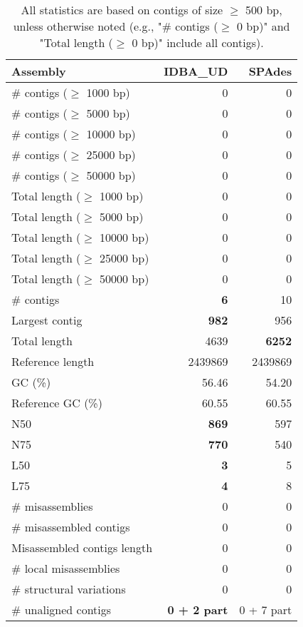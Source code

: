\documentclass[12pt,a4paper]{article}
\begin{document}
\begin{table}[ht]
\begin{center}
\caption{All statistics are based on contigs of size $\geq$ 500 bp, unless otherwise noted (e.g., "\# contigs ($\geq$ 0 bp)" and "Total length ($\geq$ 0 bp)" include all contigs).}
\begin{tabular}{|l*{2}{|r}|}
\hline
Assembly & IDBA\_UD & SPAdes \\ \hline
\# contigs ($\geq$ 1000 bp) & 0 & 0 \\ \hline
\# contigs ($\geq$ 5000 bp) & 0 & 0 \\ \hline
\# contigs ($\geq$ 10000 bp) & 0 & 0 \\ \hline
\# contigs ($\geq$ 25000 bp) & 0 & 0 \\ \hline
\# contigs ($\geq$ 50000 bp) & 0 & 0 \\ \hline
Total length ($\geq$ 1000 bp) & 0 & 0 \\ \hline
Total length ($\geq$ 5000 bp) & 0 & 0 \\ \hline
Total length ($\geq$ 10000 bp) & 0 & 0 \\ \hline
Total length ($\geq$ 25000 bp) & 0 & 0 \\ \hline
Total length ($\geq$ 50000 bp) & 0 & 0 \\ \hline
\# contigs & {\bf 6} & 10 \\ \hline
Largest contig & {\bf 982} & 956 \\ \hline
Total length & 4639 & {\bf 6252} \\ \hline
Reference length & 2439869 & 2439869 \\ \hline
GC (\%) & 56.46 & 54.20 \\ \hline
Reference GC (\%) & 60.55 & 60.55 \\ \hline
N50 & {\bf 869} & 597 \\ \hline
N75 & {\bf 770} & 540 \\ \hline
L50 & {\bf 3} & 5 \\ \hline
L75 & {\bf 4} & 8 \\ \hline
\# misassemblies & 0 & 0 \\ \hline
\# misassembled contigs & 0 & 0 \\ \hline
Misassembled contigs length & 0 & 0 \\ \hline
\# local misassemblies & 0 & 0 \\ \hline
\# structural variations & 0 & 0 \\ \hline
\# unaligned contigs & {\bf 0 + 2 part} & 0 + 7 part \\ \hline

\end{tabular}
\end{center}
\end{table}
\end{document}

